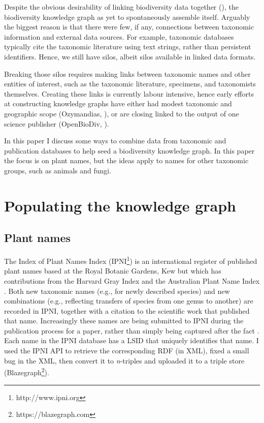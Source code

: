 \documentclass[runningheads]{llncs}
\begin{document}
Despite the obvious desirability of linking biodiversity data together (\cite{bik_lets_2017}), the biodiversity knowledge graph as yet to spontaneously assemble itself. Arguably the biggest reason is that there were few, if any, connections between taxonomic information and external data sources. For example, taxonomic databases typically cite the taxonomic literature using text strings, rather than persistent identifiers. Hence, we still have silos, albeit silos available in linked data formats.

Breaking those silos requires making links between taxonomic names and other entities of interest, such as the taxonomic literature, specimens, and taxonomists themselves. Creating these links is currently labour intensive, hence early efforts at constructing knowledge graphs have either had modest taxonomic and geographic scope (Ozymandias, \cite{page_ozymandias:_2019}), or are closing linked to the output of one science publisher (OpenBioDiv, \cite{penev_openbiodiv:_2019}).

In this paper I discuss some ways to combine data from taxonomic and publication databases to help seed a biodiversity knowledge graph. In this paper the focus is on plant names, but the ideas apply to names for other taxonomic groups, such as animals and fungi.

\section{Populating the knowledge graph}
\subsection{Plant names}

The Index of Plant Names Index (IPNI\footnote{http://www.ipni.org}) is an international register of published plant names based at the Royal Botanic Gardens, Kew but which has contributions from the Harvard Gray Index and the Australian Plant Name Index \cite{croft_plant_1999}. Both new taxonomic names (e.g., for newly described species) and new combinations (e.g., reflecting transfers of species from one genus to another) are recorded in IPNI, together with a citation to the scientific work that published that name. Increasingly these names are being submitted to IPNI during the publication process for a paper, rather than simply being captured after the fact \cite{penev_common_2016}. Each name in the IPNI database has a LSID that uniquely identifies that name. I used the IPNI API to retrieve the corresponding RDF (in XML), fixed a small bug in the XML, then convert it to \textit{n}-triples and uploaded it to a triple store (Blazegraph\footnote{https://blazegraph.com}).
\end{document}
